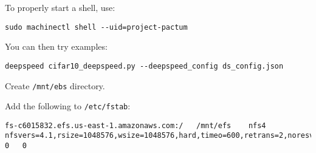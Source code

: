 To properly start a shell, use:

\begin{lstlisting}
sudo machinectl shell --uid=project-pactum
\end{lstlisting}

You can then try examples:

\begin{lstlisting}
deepspeed cifar10_deepspeed.py --deepspeed_config ds_config.json
\end{lstlisting}

Create \lstinline|/mnt/ebs| directory.

Add the following to \lstinline|/etc/fstab|:

\begin{lstlisting}
fs-c6015832.efs.us-east-1.amazonaws.com:/   /mnt/efs    nfs4    nfsvers=4.1,rsize=1048576,wsize=1048576,hard,timeo=600,retrans=2,noresvport 0   0
\end{lstlisting}
